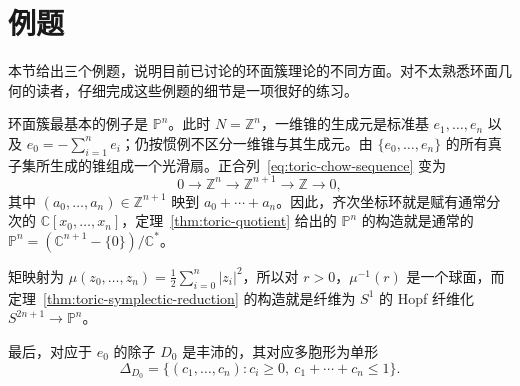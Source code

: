 \section{例题}\label{sec:toric-examples}

本节给出三个例题，说明目前已讨论的环面簇理论的不同方面。对不太熟悉环面几何的读者，仔细完成这些例题的细节是一项很好的练习。

\begin{example}\label{ex:toric-projective-space}
环面簇最基本的例子是 $\mathbb P^n$。此时 $N=\mathbb Z^n$，一维锥的生成元是标准基 $e_1,\ldots,e_n$ 以及 $e_0=-\sum_{i=1}^n e_i$；仍按惯例不区分一维锥与其生成元。由 $\{e_0,\ldots,e_n\}$ 的所有真子集所生成的锥组成一个光滑扇。正合列~\eqref{eq:toric-chow-sequence} 变为
\[
0\longrightarrow\mathbb Z^n\longrightarrow\mathbb Z^{n+1}
\longrightarrow\mathbb Z\longrightarrow0,
\]
其中 $(a_0,\ldots,a_n)\in\mathbb Z^{n+1}$ 映到 $a_0+\cdots+a_n$。因此，齐次坐标环就是赋有通常分次的 $\mathbb C[x_0,\ldots,x_n]$，定理~\ref{thm:toric-quotient} 给出的 $\mathbb P^n$ 的构造就是通常的 $\mathbb P^n=(\mathbb C^{n+1}-\{0\})/\mathbb C^*$。

矩映射为 $\mu(z_0,\ldots,z_n)=\tfrac12\sum_{i=0}^n|z_i|^2$，所以对 $r>0$，$\mu^{-1}(r)$ 是一个球面，而定理~\ref{thm:toric-symplectic-reduction} 的构造就是纤维为 $S^1$ 的 Hopf 纤维化 $S^{2n+1}\to\mathbb P^n$。

最后，对应于 $e_0$ 的除子 $D_0$ 是丰沛的，其对应多胞形为单形
\[
\Delta_{D_0}=\{(c_1,\ldots,c_n):c_i\geq0,\ c_1+\cdots+c_n\leq1\}.
\]
\end{example}

